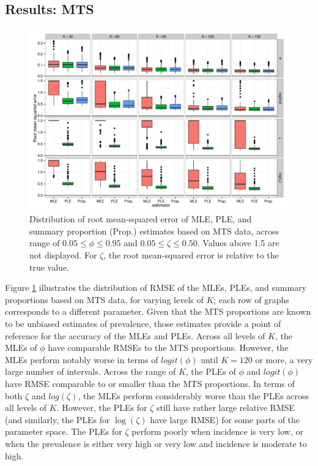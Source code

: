 \documentclass[man, noextraspace, floatsintext]{apa6}\usepackage[]{graphicx}\usepackage[]{color}
\makeatletter
\def\maxwidth{ %
  \ifdim\Gin@nat@width>\linewidth
    \linewidth
  \else
    \Gin@nat@width
  \fi
}
\newenvironment{knitrout}{}{} %
\makeatother
\begin{document}
\subsection{Results: MTS}

\begin{knitrout}
\color{fgcolor}\begin{figure}[tb]


{\centering \includegraphics[width=\maxwidth]{fig/MTS_RMSE} 

}

\caption[Distribution of root mean-squared error of MLE, PLE, and summary proportion (Prop]{Distribution of root mean-squared error of MLE, PLE, and summary proportion (Prop.) estimates based on MTS data, across range of $0.05 \leq \phi \leq 0.95$ and $0.05 \leq \zeta \leq 0.50$. Values above 1.5 are not displayed. For $\zeta$, the root mean-squared error is relative to the true value.\label{fig:MTS_RMSE}}
\end{figure}


\end{knitrout}

Figure \ref{fig:MTS_RMSE} illustrates the distribution of RMSE of the MLEs, PLEs, and summary proportions based on MTS data, for varying levels of $K$; each row of graphs corresponds to a different parameter. 
Given that the MTS proportions are known to be unbiased estimates of prevalence, those estimates provide a point of reference for the accuracy of the MLEs and PLEs. 
Across all levels of $K$, the MLEs of $\phi$ have comparable RMSEs to the MTS proportions. 
However, the MLEs perform notably worse in terms of $logit(\phi)$ until $K = 120$ or more, a very large number of intervals.
Across the range of $K$, the PLEs of $\phi$ and $logit(\phi)$ have RMSE comparable to or smaller than the MTS proportions. 
In terms of both $\zeta$ and $log(\zeta)$, the MLEs perform considerably worse than the PLEs across all levels of $K$. 
However, the PLEs for $\zeta$ still have rather large relative RMSE (and similarly, the PLEs for $\log(\zeta)$ have large RMSE) for some parts of the parameter space. The PLEs for $\zeta$ perform poorly when incidence is very low, or when the prevalence is either very high or very low and incidence is moderate to high.
\end{document}
